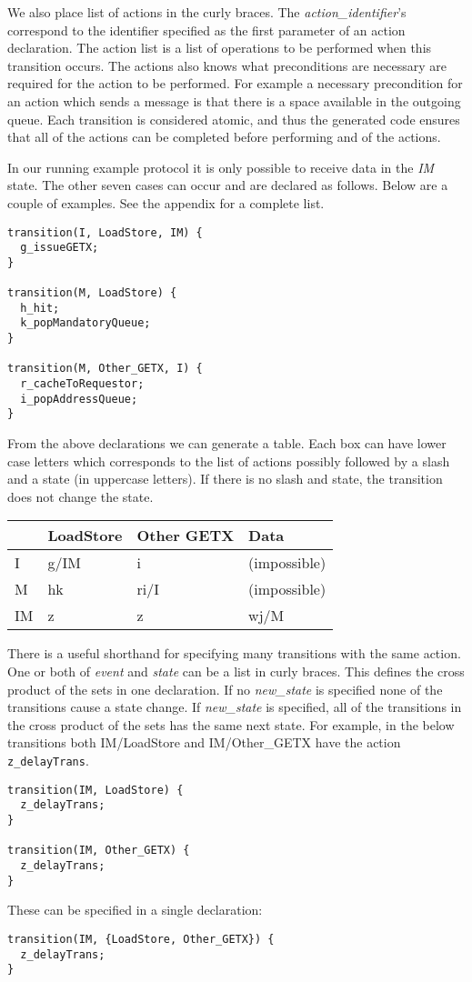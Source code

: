 \documentclass[11pt]{article}
\begin{document}
We also place list of actions in the curly braces.  The {\em
action\_identifier}'s correspond to the identifier specified as the
first parameter of an action declaration.  The action list is a list
of operations to be performed when this transition occurs.  The
actions also knows what preconditions are necessary are required for
the action to be performed.  For example a necessary precondition for
an action which sends a message is that there is a space available in
the outgoing queue.  Each transition is considered atomic, and thus
the generated code ensures that all of the actions can be completed
before performing and of the actions.

In our running example protocol it is only possible to receive data in
the {\em IM} state.  The other seven cases can occur and are declared
as follows.  Below are a couple of examples.  See the appendix for a
complete list.

\newpage
\begin{verbatim}
transition(I, LoadStore, IM) {
  g_issueGETX;
}

transition(M, LoadStore) {
  h_hit;
  k_popMandatoryQueue;
}

transition(M, Other_GETX, I) {
  r_cacheToRequestor;
  i_popAddressQueue;
}
\end{verbatim}

From the above declarations we can generate a table.  Each box can
have lower case letters which corresponds to the list of actions
possibly followed by a slash and a state (in uppercase letters).  If
there is no slash and state, the transition does not change the state.

\begin{center}
\begin{tabular}{|l||l|l|l|} \hline
   & LoadStore & Other GETX & Data \\ \hline  \hline
I & g/IM & i & (impossible)\\ \hline
M & hk & ri/I & (impossible)\\ \hline
IM & z & z & wj/M \\ \hline
\end{tabular}
\end{center}

There is a useful shorthand for specifying many transitions with the
same action.  One or both of {\em event} and {\em state} can be a list
in curly braces.  This defines the cross product of the sets in one
declaration.  If no {\em new\_state} is specified none of the
transitions cause a state change.  If {\em new\_state} is specified,
all of the transitions in the cross product of the sets has the same
next state.  For example, in the below transitions both IM/LoadStore
and IM/Other\_GETX have the action {\tt z\_delayTrans}.  
\begin{verbatim}
transition(IM, LoadStore) {
  z_delayTrans;
}

transition(IM, Other_GETX) {
  z_delayTrans;
}
\end{verbatim}
These can be specified in a single declaration:
\begin{verbatim}
transition(IM, {LoadStore, Other_GETX}) {
  z_delayTrans;
}
\end{verbatim}
\end{document}
